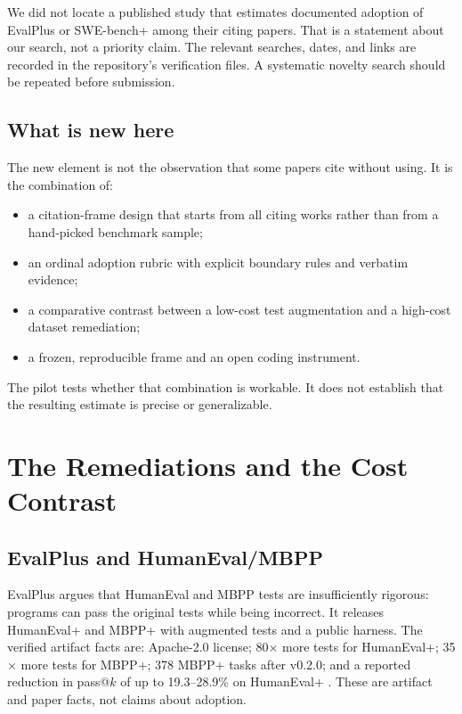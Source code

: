 \documentclass[11pt,a4paper]{article}
\begin{document}
We did not locate a published study that estimates documented adoption of EvalPlus or SWE-bench+ among their citing papers. That is a statement about our search, not a priority claim. The relevant searches, dates, and links are recorded in the repository's verification files. A systematic novelty search should be repeated before submission.

\subsection{What is new here}

The new element is not the observation that some papers cite without using. It is the combination of:
\begin{itemize}
  \item a citation-frame design that starts from all citing works rather than from a hand-picked benchmark sample;
  \item an ordinal adoption rubric with explicit boundary rules and verbatim evidence;
  \item a comparative contrast between a low-cost test augmentation and a high-cost dataset remediation;
  \item a frozen, reproducible frame and an open coding instrument.
\end{itemize}
The pilot tests whether that combination is workable. It does not establish that the resulting estimate is precise or generalizable.

\section{The Remediations and the Cost Contrast}

\subsection{EvalPlus and HumanEval/MBPP}

EvalPlus \citep{liu2023} argues that HumanEval \citep{chen2021} and MBPP \citep{austin2021} tests are insufficiently rigorous: programs can pass the original tests while being incorrect. It releases HumanEval+ and MBPP+ with augmented tests and a public harness. The verified artifact facts are: Apache-2.0 license; 80$\times$ more tests for HumanEval+; 35$\times$ more tests for MBPP+; 378 MBPP+ tasks after v0.2.0; and a reported reduction in pass@$k$ of up to 19.3--28.9\% on HumanEval+ \citep{liu2023}. These are artifact and paper facts, not claims about adoption.
\end{document}
